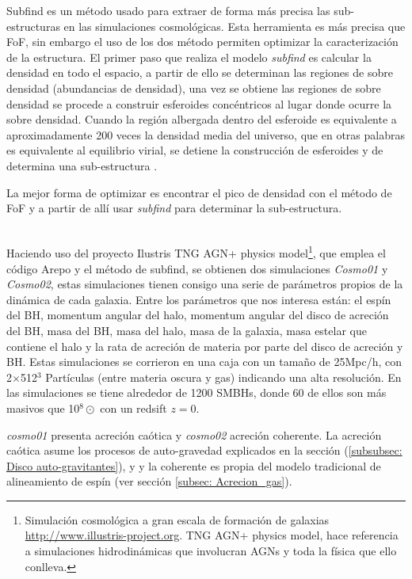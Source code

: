 Subfind es un método usado para extraer de forma más precisa las sub-estructuras en las simulaciones cosmológicas. Esta herramienta es más precisa que FoF, sin embargo el uso de los dos método permiten optimizar la caracterización de la estructura. El primer paso que realiza el modelo {\it{subfind}} es calcular la densidad en todo el espacio, a partir de ello se determinan las regiones de sobre densidad (abundancias de densidad), una vez se obtiene las regiones de sobre densidad se procede a construir esferoides concéntricos al lugar donde ocurre la sobre densidad. Cuando la región albergada dentro del esferoide es equivalente a aproximadamente 200 veces la densidad media del universo, que en otras palabras es equivalente al equilibrio virial, se detiene la construcción de esferoides y de determina una sub-estructura \cite{springel2018}.

La mejor forma de optimizar es encontrar el pico de densidad con el método de FoF y a partir de allí usar {\it{subfind}} para determinar la sub-estructura.

~\\

Haciendo uso del proyecto Ilustris TNG AGN+ physics model\footnote{Simulación cosmológica a gran escala de formación de galaxias \url{http://www.illustris-project.org}. TNG AGN+ physics model, hace referencia a simulaciones hidrodinámicas que involucran AGNs y toda la física que ello conlleva.}, que emplea el código Arepo y el método de subfind, se obtienen dos simulaciones {\it{Cosmo01}} y {\it{Cosmo02}}, estas simulaciones tienen consigo una serie de parámetros propios de la dinámica de cada galaxia. Entre los parámetros que nos interesa están: el espín del BH, momentum angular del halo, momentum angular del disco de acreción del BH, masa del BH, masa del halo, masa de la galaxia, masa estelar que contiene el halo y la rata de acreción de materia por parte del disco de acreción y BH. Estas simulaciones se corrieron en una caja con un tamaño de 25Mpc/h, con 2$\times$512$^{3}$ Partículas (entre materia oscura y gas) indicando una alta resolución. En las simulaciones se tiene alrededor de 1200 SMBHs, donde 60 de ellos son más masivos que 10$^{8}\odot$ con un redsift $z=0$.

{\it{cosmo01}} presenta acreción caótica y {\it{cosmo02}} acreción coherente. La acreción caótica asume los procesos de auto-gravedad explicados en la sección (\ref{subsubsec: Disco auto-gravitantes}), y
 y la coherente es propia del modelo tradicional de alineamiento de espín (ver sección \ref{subsec: Acrecion_gas}).











